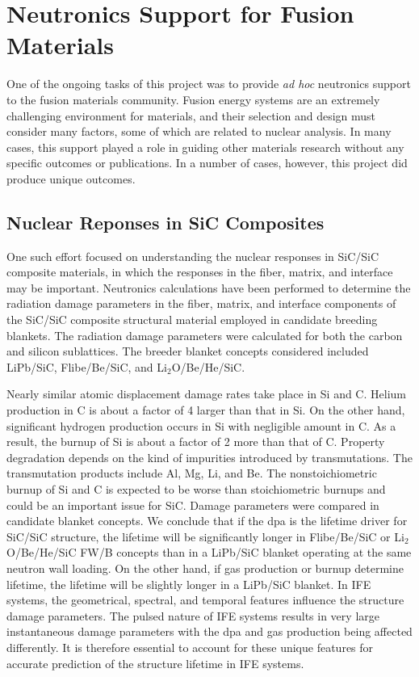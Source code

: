 \chapter{Neutronics Support for Fusion Materials}

One of the ongoing tasks of this project was to provide \emph{ad hoc}
neutronics support to the fusion materials community.  Fusion energy systems
are an extremely challenging environment for materials, and their selection
and design must consider many factors, some of which are related to nuclear
analysis.  In many cases, this support played a role in guiding other
materials research without any specific outcomes or publications.  In a number
of cases, however, this project did produce unique outcomes.

\section{Nuclear Reponses in SiC Composites}

One such effort focused on understanding the nuclear responses in SiC/SiC
composite materials, in which the responses in the fiber, matrix, and
interface may be important.  Neutronics calculations have been performed to
determine the radiation damage parameters in the fiber, matrix, and interface
components of the SiC/SiC composite structural material employed in candidate
breeding blankets. The radiation damage parameters were calculated for both
the carbon and silicon sublattices. The breeder blanket concepts considered
included LiPb/SiC, Flibe/Be/SiC, and Li$_2$O/Be/He/SiC.

Nearly similar atomic displacement damage rates take place in Si and C. Helium
production in C is about a factor of 4 larger than that in Si. On the other
hand, significant hydrogen production occurs in Si with negligible amount in
C. As a result, the burnup of Si is about a factor of 2 more than that of
C. Property degradation depends on the kind of impurities introduced by
transmutations. The transmutation products include Al, Mg, Li, and Be. The
nonstoichiometric burnup of Si and C is expected to be worse than
stoichiometric burnups and could be an important issue for SiC. Damage
parameters were compared in candidate blanket concepts. We conclude that if
the dpa is the lifetime driver for SiC/SiC structure, the lifetime will be
significantly longer in Flibe/Be/SiC or Li$_2$O/Be/He/SiC \gls{FW/B} concepts
than in a LiPb/SiC blanket operating at the same neutron wall loading. On the
other hand, if gas production or burnup determine lifetime, the lifetime will
be slightly longer in a LiPb/SiC blanket.  In \gls{IFE} systems, the geometrical,
spectral, and temporal features influence the structure damage parameters. The
pulsed nature of \gls{IFE} systems results in very large instantaneous damage
parameters with the dpa and gas production being affected differently. It is
therefore essential to account for these unique features for accurate
prediction of the structure lifetime in \gls{IFE} systems.

